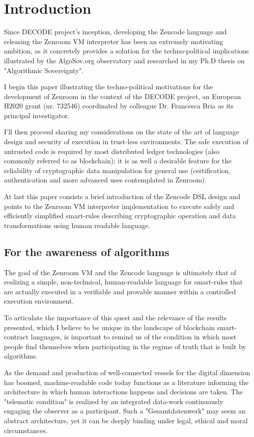 \documentclass{svproc}
\begin{document}
\section{Introduction}
%
Since DECODE project's inception, developing the Zencode language and
releasing the Zenroom VM interpreter has been an extremely motivating
ambition, as it concretely provides a solution for the
techno-political implications illustrated by the AlgoSov.org
observatory and researched in my Ph.D thesis on "Algorithmic
Sovereignty".

I begin this paper illustrating the techno-political motivations for
the development of Zenroom in the context of the DECODE project, an
European H2020 grant (nr. 732546) coordinated by colleague
Dr. Francesca Bria as its principal investigator.

I'll then proceed sharing my considerations on the state of the art of
language design and security of execution in trust-less
environments. The safe execution of untrusted code is required by most
distributed ledger technologies (also commonly referred to as
blockchain); it is as well a desirable feature for the reliability of
cryptographic data manipulation for general use (certification,
authentication and more advanced uses contemplated in Zenroom).

At last this paper consists a brief introduction of the Zencode DSL
design and points to the Zenroom VM interpreter implementation to
execute safely and efficiently simplified smart-rules describing
cryptographic operation and data transformations using human readable
language.

%
\subsection{For the awareness of algorithms}
%

The goal of the Zenroom VM and the Zencode language is ultimately that
of realizing a simple, non-technical, human-readable language for
smart-rules that are actually executed in a verifiable and provable
manner within a controlled execution environment.

To articulate the importance of this quest and the relevance of the
results presented, which I believe to be unique in the landscape of
blockchain smart-contract languages, is important to remind us of the
condition in which most people find themselves when participating in
the regime of truth that is built by algorithms.

As the demand and production of well-connected vessels for the digital
dimension has boomed, machine-readable code today functions as a
literature informing the architecture in which human interactions
happens and decisions are taken. The "telematic condition" is realized
by an integrated data-work continuously engaging the observer as a
participant. Such a "Gesamtdatenwerk" \cite{ascott2004} may seem
an abstract architecture, yet it can be deeply binding under legal,
ethical and moral circumstances.
\end{document}
